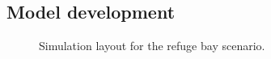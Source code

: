 	\subsection{Model development}
	\begin{figure}[h!]
		\centering
		\caption{Simulation layout for the refuge bay scenario.}
		\label{fig: KUS Baseline}
	\end{figure}		
	
